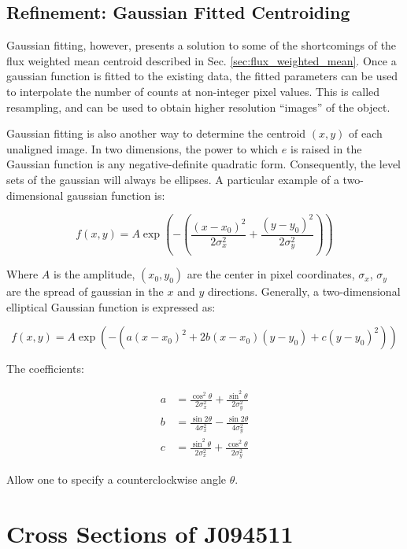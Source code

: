 \documentclass[a4paper,11pt]{article}
\begin{document}
\subsection{Refinement: Gaussian Fitted Centroiding}

Gaussian fitting, however, presents a solution to some of the shortcomings of the flux weighted mean centroid described in Sec. \ref{sec:flux_weighted_mean}. Once a gaussian function is fitted to the existing data, the fitted parameters can be used to interpolate the number of counts at non-integer pixel values. This is called resampling, and can be used to obtain higher resolution ``images'' of the object.

Gaussian fitting is also another way to determine the centroid $(x,y)$ of each unaligned image. In two dimensions, the power to which $e$ is raised in the Gaussian function is any negative-definite quadratic form. Consequently, the level sets of the gaussian will always be ellipses.\cite{astropy_gaussian} A particular example of a two-dimensional gaussian function is:

\begin{equation}
    f(x,y) = A \exp\left(- \left(\frac{(x-x_0)^2}{2\sigma_x^2} + \frac{(y-y_0)^2}{2\sigma_y^2} \right)\right)
\end{equation}

\noindent Where $A$ is the amplitude, $(x_0, y_0)$ are the center in pixel coordinates, $\sigma_x$, $\sigma_y$ are the spread of gaussian in the $x$ and $y$ directions.\cite{wolfram_gaussian} Generally, a two-dimensional elliptical Gaussian function is expressed as:

\begin{equation}
    f(x,y) = A \exp\left(- \left(a(x - x_0)^2 + 2b(x-x_0)(y-y_0) + c(y-y_0)^2 \right)\right)
\end{equation}

\noindent The coefficients:

\begin{align}
a & = \frac{\cos^2\theta}{2\sigma_x^2} + \frac{\sin^2\theta}{2\sigma_y^2} \\
b & = \frac{\sin2\theta}{4\sigma_x^2} - \frac{\sin2\theta}{4\sigma_y^2} \\
c & = \frac{\sin^2\theta}{2\sigma_x^2} + \frac{\cos^2\theta}{2\sigma_y^2}
\end{align}

Allow one to specify a counterclockwise angle $\theta$.\cite{astropy_gaussian}

\section{Cross Sections of J094511}
\end{document}
